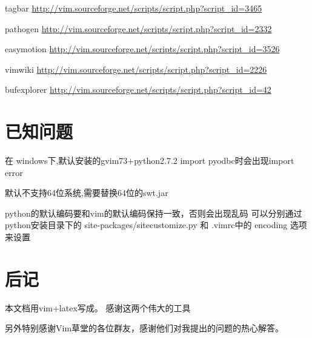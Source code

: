 \documentclass[oneside,openany]{book}
\begin{document}
  tagbar
  \href{http://vim.sourceforge.net/scripts/script.php?script\_id=3465}
   {http://vim.sourceforge.net/scripts/script.php?script\_id=3465}

  pathogen
  \href{http://vim.sourceforge.net/scripts/script.php?script\_id=2332}
   {http://vim.sourceforge.net/scripts/script.php?script\_id=2332}

  easymotion
  \href{http://vim.sourceforge.net/scripts/script.php?script\_id=3526}
   {http://vim.sourceforge.net/scripts/script.php?script\_id=3526}

  vimwiki
  \href{http://vim.sourceforge.net/scripts/script.php?script\_id=2226}
   {http://vim.sourceforge.net/scripts/script.php?script\_id=2226}


  bufexplorer
  \href{http://vim.sourceforge.net/scripts/script.php?script\_id=42}
   {http://vim.sourceforge.net/scripts/script.php?script\_id=42}

\chapter{已知问题}


    在 windows下,默认安装的gvim73+python2.7.2 import pyodbc时会出现import error 

    默认不支持64位系统,需要替换64位的swt.jar 

    python的默认编码要和vim的默认编码保持一致，否则会出现乱码 可以分别通过 python安装目录下的
    site-packages/sitecustomize.py 和 .vimrc中的 encoding 选项来设置 

\chapter{后记}
   本文档用vim+latex写成。 感谢这两个伟大的工具

   另外特别感谢Vim草堂的各位群友，感谢他们对我提出的问题的热心解答。
   
   
\end{document}
